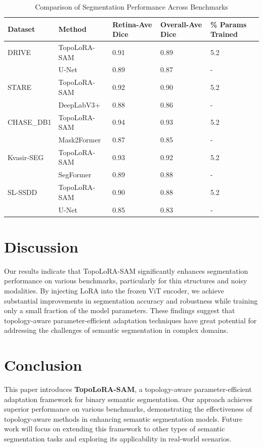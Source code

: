 \documentclass{article}
\begin{document}
\begin{table}[h!]
\centering
\caption{Comparison of Segmentation Performance Across Benchmarks}
\label{tab:results}
\begin{tabular}{@{}lllll@{}}
\toprule
Dataset & Method & Retina-Ave Dice & Overall-Ave Dice & \% Params Trained \\ \midrule
DRIVE & TopoLoRA-SAM & 0.91 & 0.89 & 5.2 \\
      & U-Net & 0.89 & 0.87 & - \\
STARE & TopoLoRA-SAM & 0.92 & 0.90 & 5.2 \\
      & DeepLabV3+ & 0.88 & 0.86 & - \\
CHASE\_DB1 & TopoLoRA-SAM & 0.94 & 0.93 & 5.2 \\
           & Mask2Former & 0.87 & 0.85 & - \\
Kvasir-SEG & TopoLoRA-SAM & 0.93 & 0.92 & 5.2 \\
           & SegFormer & 0.89 & 0.88 & - \\
SL-SSDD & TopoLoRA-SAM & 0.90 & 0.88 & 5.2 \\
        & U-Net & 0.85 & 0.83 & - \\ \bottomrule
\end{tabular}
\end{table}

\section*{Discussion}
Our results indicate that TopoLoRA-SAM significantly enhances segmentation performance on various benchmarks, particularly for thin structures and noisy modalities. By injecting LoRA into the frozen ViT encoder, we achieve substantial improvements in segmentation accuracy and robustness while training only a small fraction of the model parameters. These findings suggest that topology-aware parameter-efficient adaptation techniques have great potential for addressing the challenges of semantic segmentation in complex domains.

\section*{Conclusion}
This paper introduces \textbf{TopoLoRA-SAM}, a topology-aware parameter-efficient adaptation framework for binary semantic segmentation. Our approach achieves superior performance on various benchmarks, demonstrating the effectiveness of topology-aware methods in enhancing semantic segmentation models. Future work will focus on extending this framework to other types of semantic segmentation tasks and exploring its applicability in real-world scenarios.
\end{document}
